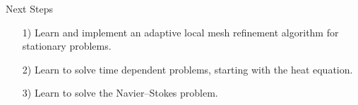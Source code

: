 \documentclass[9pt]{beamer}
\begin{document}
\begin{frame}{Next Steps}
	\begin{itemize}
		\item[1)] Learn and implement an adaptive local mesh refinement algorithm for stationary problems.
		\vspace{1cm}
		\item[2)] Learn to solve time dependent problems, starting with the heat equation.
		\vspace{1cm}
		\item[3)] Learn to solve the Navier--Stokes problem.
	\end{itemize}
\end{frame}
\end{document}
